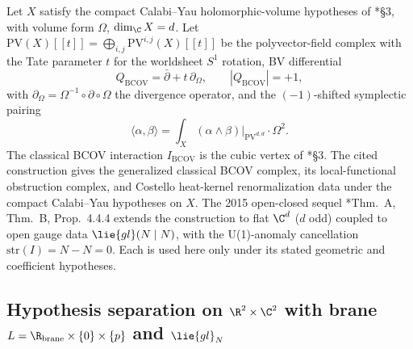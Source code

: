 \begin{stmt}\label{stmt:costello-li-2012-restated}
  Let \(X\) satisfy the compact Calabi--Yau holomorphic-volume
  hypotheses of \cite{costello-li-quantum-bcov}*{\S3}, with volume form
  \(\Omega\), \(\dim_{\C}X=d\).  Let
  \(\mathrm{PV}(X)[[t]]=\bigoplus_{i,j}\mathrm{PV}^{i,j}(X)[[t]]\) be
  the polyvector-field complex with the Tate parameter \(t\) for the
  worldsheet \(S^1\) rotation, BV differential
  \[
    Q_{\mathrm{BCOV}}=\bar\partial+t\,\partial_\Omega,\qquad
      |Q_{\mathrm{BCOV}}|=+1,
  \]
  with \(\partial_\Omega=\Omega^{-1}\circ\partial\circ\Omega\) the
  divergence operator, and the \((-1)\)-shifted symplectic pairing
  \[
    \langle\alpha,\beta\rangle
      =\int_X(\alpha\wedge\beta)\big|_{\mathrm{PV}^{d,d}}\cdot\Omega^2.
  \]
  The classical BCOV interaction \(I_{\mathrm{BCOV}}\) is the cubic
  vertex of \cite{costello-li-quantum-bcov}*{\S3}.  The cited
  construction gives the generalized classical BCOV complex, its
  local-functional obstruction complex, and Costello heat-kernel
  renormalization data under the compact Calabi--Yau hypotheses on
  \(X\).  The 2015 open-closed sequel
  \cite{costello-li-open-closed-bcov}*{Thm.~A, Thm.~B, Prop.~4.4.4}
  extends the construction to flat
  \(\C^d\) (\(d\) odd) coupled to open gauge data
  \(\lie{gl}(N\mid N)\), with the U(1)-anomaly cancellation
  \(\mathrm{str}(I)=N-N=0\).  Each is used here only under its stated
  geometric and coefficient hypotheses.
\end{stmt}

\subsection*{Hypothesis separation on \texorpdfstring{$\R^2\times\C^2$}{R2 x C2}
   with brane \texorpdfstring{$L=\R_{\mathrm{brane}}\times\{0\}\times\{p\}$}{L} and \texorpdfstring{$\lie{gl}_N$}{gl\_N}}

